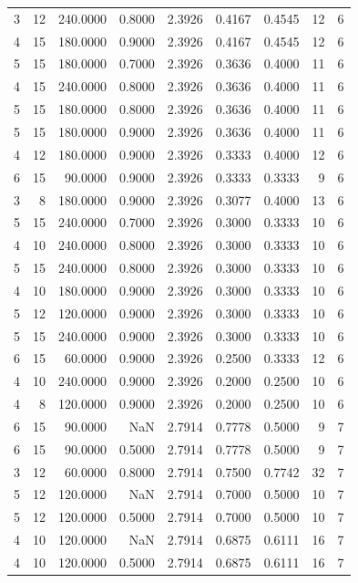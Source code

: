 \begin{tabular}{rrrrrrrrr}
3 & 12 & 240.0000 & 0.8000 & 2.3926 & 0.4167 & 0.4545 & 12 & 6 \\
4 & 15 & 180.0000 & 0.9000 & 2.3926 & 0.4167 & 0.4545 & 12 & 6 \\
5 & 15 & 180.0000 & 0.7000 & 2.3926 & 0.3636 & 0.4000 & 11 & 6 \\
4 & 15 & 240.0000 & 0.8000 & 2.3926 & 0.3636 & 0.4000 & 11 & 6 \\
5 & 15 & 180.0000 & 0.8000 & 2.3926 & 0.3636 & 0.4000 & 11 & 6 \\
5 & 15 & 180.0000 & 0.9000 & 2.3926 & 0.3636 & 0.4000 & 11 & 6 \\
4 & 12 & 180.0000 & 0.9000 & 2.3926 & 0.3333 & 0.4000 & 12 & 6 \\
6 & 15 & 90.0000 & 0.9000 & 2.3926 & 0.3333 & 0.3333 & 9 & 6 \\
3 & 8 & 180.0000 & 0.9000 & 2.3926 & 0.3077 & 0.4000 & 13 & 6 \\
5 & 15 & 240.0000 & 0.7000 & 2.3926 & 0.3000 & 0.3333 & 10 & 6 \\
4 & 10 & 240.0000 & 0.8000 & 2.3926 & 0.3000 & 0.3333 & 10 & 6 \\
5 & 15 & 240.0000 & 0.8000 & 2.3926 & 0.3000 & 0.3333 & 10 & 6 \\
4 & 10 & 180.0000 & 0.9000 & 2.3926 & 0.3000 & 0.3333 & 10 & 6 \\
5 & 12 & 120.0000 & 0.9000 & 2.3926 & 0.3000 & 0.3333 & 10 & 6 \\
5 & 15 & 240.0000 & 0.9000 & 2.3926 & 0.3000 & 0.3333 & 10 & 6 \\
6 & 15 & 60.0000 & 0.9000 & 2.3926 & 0.2500 & 0.3333 & 12 & 6 \\
4 & 10 & 240.0000 & 0.9000 & 2.3926 & 0.2000 & 0.2500 & 10 & 6 \\
4 & 8 & 120.0000 & 0.9000 & 2.3926 & 0.2000 & 0.2500 & 10 & 6 \\
6 & 15 & 90.0000 & NaN & 2.7914 & 0.7778 & 0.5000 & 9 & 7 \\
6 & 15 & 90.0000 & 0.5000 & 2.7914 & 0.7778 & 0.5000 & 9 & 7 \\
3 & 12 & 60.0000 & 0.8000 & 2.7914 & 0.7500 & 0.7742 & 32 & 7 \\
5 & 12 & 120.0000 & NaN & 2.7914 & 0.7000 & 0.5000 & 10 & 7 \\
5 & 12 & 120.0000 & 0.5000 & 2.7914 & 0.7000 & 0.5000 & 10 & 7 \\
4 & 10 & 120.0000 & NaN & 2.7914 & 0.6875 & 0.6111 & 16 & 7 \\
4 & 10 & 120.0000 & 0.5000 & 2.7914 & 0.6875 & 0.6111 & 16 & 7 \\

\end{tabular}
